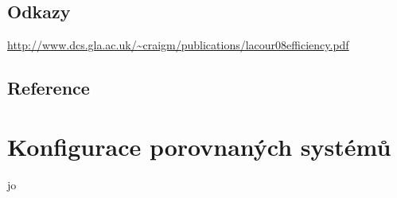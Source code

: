 \documentclass[12pt,letterpaper,oneside,openright]{book}
\begin{document}
\section*{Odkazy}
\url{http://www.dcs.gla.ac.uk/~craigm/publications/lacour08efficiency.pdf}

\newpage
\section*{Reference}



\appendix
\chapter{Konfigurace porovnaných systémů} \label{appendix:search_config}
jo


\backmatter
\end{document}
